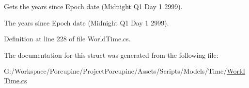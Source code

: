 Gets the years since Epoch date (Midnight Q1 Day 1 2999). 

The years since Epoch date (Midnight Q1 Day 1 2999).

Definition at line 228 of file World\+Time.\+cs.



The documentation for this struct was generated from the following file\+:\begin{DoxyCompactItemize}
\item 
G\+:/\+Workspace/\+Porcupine/\+Project\+Porcupine/\+Assets/\+Scripts/\+Models/\+Time/\hyperlink{_world_time_8cs}{World\+Time.\+cs}\end{DoxyCompactItemize}
